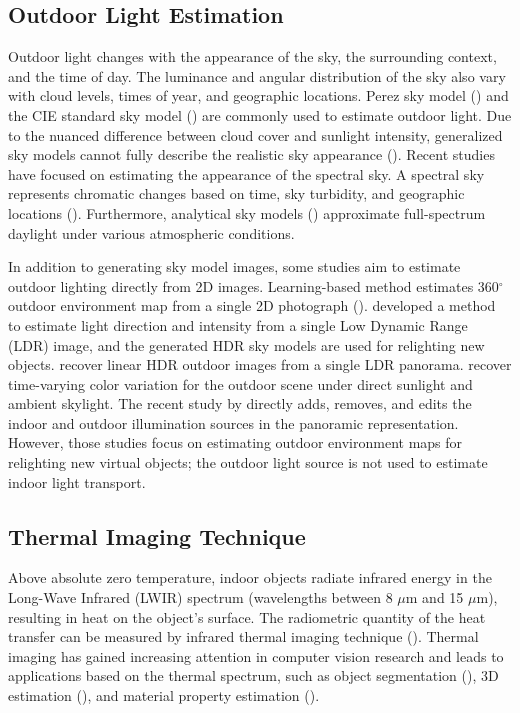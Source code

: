 \subsection{Outdoor Light Estimation}
Outdoor light changes with the appearance of the sky, the surrounding context, and the time of day. The luminance and angular distribution of the sky also vary with cloud levels, times of year, and geographic locations. Perez sky model (\cite{perez1993all}) and the CIE standard sky model (\cite{cie2003spitial}) are commonly used to estimate outdoor light. Due to the nuanced difference between cloud cover and sunlight intensity, generalized sky models cannot fully describe the realistic sky appearance (\cite{darula2002cie}). Recent studies have focused on estimating the appearance of the spectral sky. A spectral sky represents chromatic changes based on time, sky turbidity, and geographic locations (\cite{hosek2012analytic}). Furthermore, analytical sky models (\cite{lalonde2012estimating,preetham1999practical}) approximate full-spectrum daylight under various atmospheric conditions.  

In addition to generating sky model images, some studies aim to estimate outdoor lighting directly from 2D images. Learning-based method estimates 360$^{\circ}$ outdoor environment map from a single 2D photograph (\cite{hold2017deep,lalonde2014lighting}). \cite{lalonde2014lighting} developed a method to estimate light direction and intensity from a single Low Dynamic Range (LDR) image, and the generated HDR sky models are used for relighting new objects. \cite{zhang2017learning} recover linear HDR outdoor images from a single LDR panorama. \cite{sunkavalli2008color} recover time-varying color variation for the outdoor scene under direct sunlight and ambient skylight. The recent study by \cite{dastjerdi2023everlight} directly adds, removes, and edits the indoor and outdoor illumination sources in the panoramic representation. However, those studies focus on estimating outdoor environment maps for relighting new virtual objects; the outdoor light source is not used to estimate indoor light transport.

\subsection{Thermal Imaging Technique}
Above absolute zero temperature, indoor objects radiate infrared energy in the Long-Wave Infrared (LWIR) spectrum (wavelengths between 8 $\mu\text{m}$ and 15 $\mu\text{m}$), resulting in heat on the object's surface. The radiometric quantity of the heat transfer can be measured by infrared thermal imaging technique (\cite{holst2000common,kaplan2007practical,vollmer2020infrared,planinsic2011infrared}).  
Thermal imaging has gained increasing attention in computer vision research and leads to applications based on the thermal spectrum, such as object segmentation (\cite{huo2023glass}), 3D estimation (\cite{eren2009scanning,shin2023deep,narayanan2025shape}), and material property estimation (\cite{dashpute2023thermal}).

